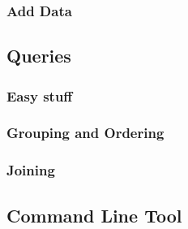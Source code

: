 \subsubsection{Add Data}

\subsection{Queries}

\subsubsection{Easy stuff}

\subsubsection{Grouping and Ordering}


\subsubsection{Joining}

\subsection{Command Line Tool}

